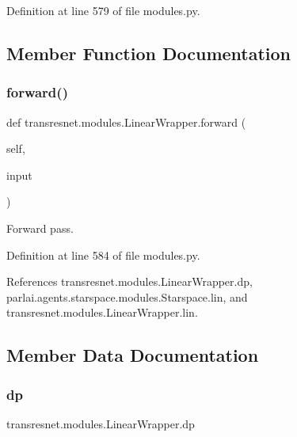 Definition at line 579 of file modules.\+py.



\subsection{Member Function Documentation}
\mbox{\label{classtransresnet_1_1modules_1_1LinearWrapper_a0555b18d80bd70ac90fa9c236a5f62db}} 
\subsubsection{\texorpdfstring{forward()}{forward()}}
{\footnotesize\ttfamily def transresnet.\+modules.\+Linear\+Wrapper.\+forward (\begin{DoxyParamCaption}\item[{}]{self,  }\item[{}]{input }\end{DoxyParamCaption})}

\begin{DoxyVerb}Forward pass.\end{DoxyVerb}
 

Definition at line 584 of file modules.\+py.



References transresnet.\+modules.\+Linear\+Wrapper.\+dp, parlai.\+agents.\+starspace.\+modules.\+Starspace.\+lin, and transresnet.\+modules.\+Linear\+Wrapper.\+lin.



\subsection{Member Data Documentation}
\mbox{\label{classtransresnet_1_1modules_1_1LinearWrapper_aef8b1be67f1b1a02f4e4004c83f680f7}} 
\subsubsection{\texorpdfstring{dp}{dp}}
{\footnotesize\ttfamily transresnet.\+modules.\+Linear\+Wrapper.\+dp}



